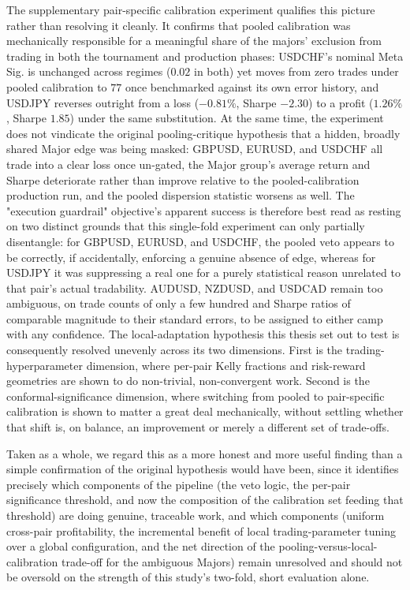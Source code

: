 \documentclass[12pt, a4paper]{article}
\begin{document}
\medskip

The supplementary pair-specific calibration experiment qualifies this picture rather than resolving it cleanly. It confirms that pooled calibration was mechanically responsible for 
a meaningful share of the majors' exclusion from trading in both the tournament and production phases: USDCHF's nominal Meta Sig. is unchanged across regimes ($0.02$ in both) yet 
moves from zero trades under pooled calibration to $77$ once benchmarked against its own error history, and USDJPY reverses outright from a loss ($-0.81\%$, Sharpe $-2.30$) to a 
profit ($1.26\%$, Sharpe $1.85$) under the same substitution. At the same time, the experiment does not vindicate the original pooling-critique hypothesis that a hidden, broadly 
shared Major edge was being masked: GBPUSD, EURUSD, and USDCHF all trade into a clear loss once un-gated, the Major group's average return and Sharpe deteriorate rather than 
improve relative to the pooled-calibration production run, and the pooled dispersion statistic worsens as well. The "execution guardrail" objective's apparent success is therefore 
best read as resting on two distinct grounds that this single-fold experiment can only partially disentangle: for GBPUSD, EURUSD, and USDCHF, the pooled veto appears to be 
correctly, if accidentally, enforcing a genuine absence of edge, whereas for USDJPY it was suppressing a real one for a purely statistical reason unrelated to that pair's actual 
tradability. AUDUSD, NZDUSD, and USDCAD remain too ambiguous, on trade counts of only a few hundred and Sharpe ratios of comparable magnitude to their standard errors, to be 
assigned to either camp with any confidence. The local-adaptation hypothesis this thesis set out to test is consequently resolved unevenly across its two dimensions. First is the 
trading-hyperparameter dimension, where per-pair Kelly fractions and risk-reward geometries are shown to do non-trivial, non-convergent work. Second is the 
conformal-significance dimension, where switching from pooled to pair-specific calibration is shown to matter a great deal mechanically, without settling whether that shift is, on 
balance, an improvement or merely a different set of trade-offs.

\medskip

Taken as a whole, we regard this as a more honest and more useful finding than a simple confirmation of the original hypothesis would have been, since it identifies precisely which 
components of the pipeline (the veto logic, the per-pair significance threshold, and now the composition of the calibration set feeding that threshold) are doing genuine, traceable 
work, and which components (uniform cross-pair profitability, the incremental benefit of local trading-parameter tuning over a global configuration, and the net direction of the 
pooling-versus-local-calibration trade-off for the ambiguous Majors) remain unresolved and should not be oversold on the strength of this study's two-fold, short evaluation alone.
\end{document}

